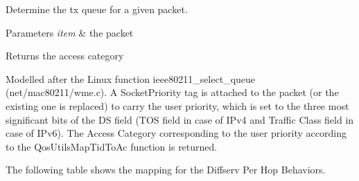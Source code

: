 Determine the tx queue for a given packet. 


\begin{DoxyParams}{Parameters}
{\em item} & the packet \\
\hline
\end{DoxyParams}
\begin{DoxyReturn}{Returns}
the access category
\end{DoxyReturn}
Modelled after the Linux function ieee80211\+\_\+select\+\_\+queue (net/mac80211/wme.\+c). A Socket\+Priority tag is attached to the packet (or the existing one is replaced) to carry the user priority, which is set to the three most significant bits of the DS field (T\+OS field in case of I\+Pv4 and Traffic Class field in case of I\+Pv6). The Access Category corresponding to the user priority according to the Qos\+Utils\+Map\+Tid\+To\+Ac function is returned.

The following table shows the mapping for the Diffserv Per Hop Behaviors.


